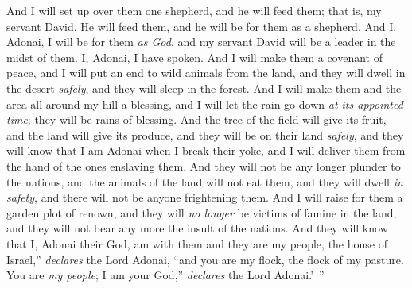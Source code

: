 \begin{biblechapter}
\verse And I will set up over them one shepherd, and he will feed them; that is, my servant David. He will feed them, and he will be for them as a shepherd.
\verse And I, Adonai, I will be for them \textit{as God}, and my servant David will be a leader in the midst of them. I, Adonai, I have spoken.
\verse And I will make them a covenant of peace, and I will put an end to wild animals from the land, and they will dwell in the desert \textit{safely}, and they will sleep in the forest.
\verse And I will make them and the area all around my hill a blessing, and I will let the rain go down \textit{at its appointed time}; they will be rains of blessing.
\verse And the tree of the field will give its fruit, and the land will give its produce, and they will be on their land \textit{safely}, and they will know that I am Adonai when I break their yoke, and I will deliver them from the hand of the ones enslaving them.
\verse And they will not be any longer plunder to the nations, and the animals of the land will not eat them, and they will dwell \textit{in safety}, and there will not be anyone frightening them.
\verse And I will raise for them a garden plot of renown, and they will \textit{no longer} be victims of famine in the land, and they will not bear any more the insult of the nations.
\verse And they will know that I, Adonai their God, am with them and they are my people, the house of Israel,” \textit{declares} the Lord Adonai,
\verse “and you are my flock, the flock of my pasture. You are \textit{my people}; I am your God,” \textit{declares} the Lord Adonai.’ ”
\end{biblechapter}


